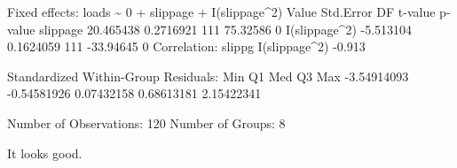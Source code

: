\documentclass[
]{article}
\newenvironment{Shaded}{\begin{snugshade}}{\end{snugshade}}
\newcommand{\AttributeTok}[1]{\textcolor[rgb]{0.77,0.63,0.00}{#1}}
\newcommand{\CommentTok}[1]{\textcolor[rgb]{0.56,0.35,0.01}{\textit{#1}}}
\newcommand{\ControlFlowTok}[1]{\textcolor[rgb]{0.13,0.29,0.53}{\textbf{#1}}}
\newcommand{\DecValTok}[1]{\textcolor[rgb]{0.00,0.00,0.81}{#1}}
\newcommand{\ErrorTok}[1]{\textcolor[rgb]{0.64,0.00,0.00}{\textbf{#1}}}
\newcommand{\FloatTok}[1]{\textcolor[rgb]{0.00,0.00,0.81}{#1}}
\newcommand{\FunctionTok}[1]{\textcolor[rgb]{0.00,0.00,0.00}{#1}}
\newcommand{\NormalTok}[1]{#1}
\newcommand{\OtherTok}[1]{\textcolor[rgb]{0.56,0.35,0.01}{#1}}
\newcommand{\SpecialCharTok}[1]{\textcolor[rgb]{0.00,0.00,0.00}{#1}}
\newcommand{\StringTok}[1]{\textcolor[rgb]{0.31,0.60,0.02}{#1}}
\begin{document}
\begin{Shaded}
\begin{Highlighting}[]
\NormalTok{Fixed effects}\SpecialCharTok{:}\NormalTok{  loads }\SpecialCharTok{\textasciitilde{}} \DecValTok{0} \SpecialCharTok{+}\NormalTok{ slippage }\SpecialCharTok{+} \FunctionTok{I}\NormalTok{(slippage}\SpecialCharTok{\^{}}\DecValTok{2}\NormalTok{) }
\NormalTok{                  Value Std.Error  DF   t}\SpecialCharTok{{-}}\NormalTok{value p}\SpecialCharTok{{-}}\NormalTok{value}
\NormalTok{slippage      }\FloatTok{20.465438} \FloatTok{0.2716921} \DecValTok{111}  \FloatTok{75.32586}       \DecValTok{0}
\FunctionTok{I}\NormalTok{(slippage}\SpecialCharTok{\^{}}\DecValTok{2}\NormalTok{) }\SpecialCharTok{{-}}\FloatTok{5.513104} \FloatTok{0.1624059} \DecValTok{111} \SpecialCharTok{{-}}\FloatTok{33.94645}       \DecValTok{0}
\NormalTok{ Correlation}\SpecialCharTok{:} 
\NormalTok{              slippg}
\FunctionTok{I}\NormalTok{(slippage}\SpecialCharTok{\^{}}\DecValTok{2}\NormalTok{) }\SpecialCharTok{{-}}\FloatTok{0.913}

\NormalTok{Standardized Within}\SpecialCharTok{{-}}\NormalTok{Group Residuals}\SpecialCharTok{:}
\NormalTok{        Min          Q1         Med          Q3         Max }
\SpecialCharTok{{-}}\FloatTok{3.54914093} \SpecialCharTok{{-}}\FloatTok{0.54581926}  \FloatTok{0.07432158}  \FloatTok{0.68613181}  \FloatTok{2.15422341} 

\NormalTok{Number of Observations}\SpecialCharTok{:} \DecValTok{120}
\NormalTok{Number of Groups}\SpecialCharTok{:} \DecValTok{8} 
\end{Highlighting}
\end{Shaded}

It looks good.

\begin{Shaded}
\end{Shaded}
\end{document}
